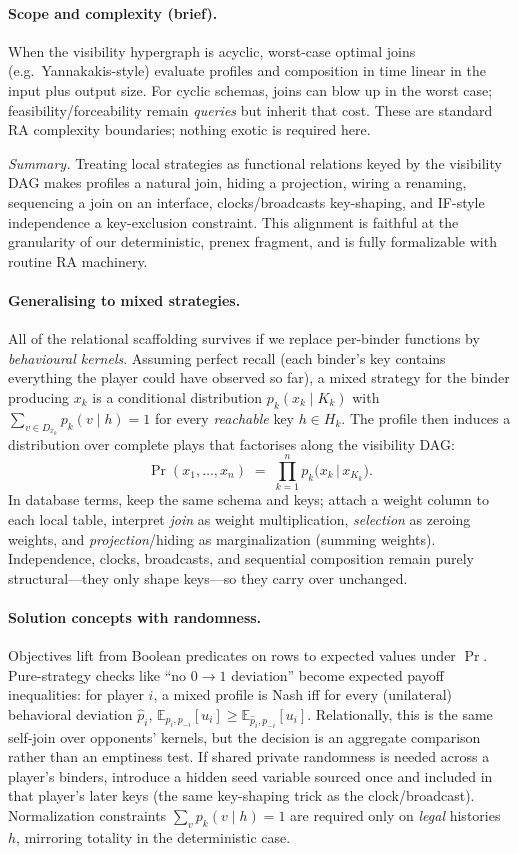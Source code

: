 \paragraph{Scope and complexity (brief).}
When the visibility hypergraph is acyclic, worst-case optimal joins (e.g.\
Yannakakis-style) evaluate profiles and composition in time linear in the
input plus output size.  For cyclic schemas, joins can blow up in the worst
case; feasibility/forceability remain \emph{queries} but inherit that cost.
These are standard RA complexity boundaries; nothing exotic is required here.

\medskip
\noindent
\emph{Summary.} Treating local strategies as functional relations keyed by the
visibility DAG makes profiles a natural join, hiding a projection, wiring a
renaming, sequencing a join on an interface, clocks/broadcasts key-shaping,
and IF-style independence a key-exclusion constraint.  This alignment is
faithful at the granularity of our deterministic, prenex fragment, and is
fully formalizable with routine RA machinery.

\paragraph{Generalising to mixed strategies.}
All of the relational scaffolding survives if we replace per-binder functions by
\emph{behavioural kernels}. Assuming perfect recall (each binder’s key contains
everything the player could have observed so far), a mixed strategy for the
binder producing $x_k$ is a conditional distribution
\(p_k(x_k \mid K_k)\) with \(\sum_{v\in D_{x_k}} p_k(v\mid h)=1\) for every
\emph{reachable} key $h\in H_k$. The profile then induces a distribution over
complete plays that factorises along the visibility DAG:
\[
  \Pr(x_1,\dots,x_n) \;=\; \prod_{k=1}^n p_k\!\big(x_k \,\big|\, x_{K_k}\big).
\]
In database terms, keep the same schema and keys; attach a weight column to each
local table, interpret \emph{join} as weight multiplication, \emph{selection} as
zeroing weights, and \emph{projection}/hiding as marginalization (summing
weights). Independence, clocks, broadcasts, and sequential composition remain
purely structural—they only shape keys—so they carry over unchanged.

\paragraph{Solution concepts with randomness.}
Objectives lift from Boolean predicates on rows to expected values under
\(\Pr\). Pure-strategy checks like “no $0\!\to\!1$ deviation” become expected
payoff inequalities: for player $i$, a mixed profile is Nash iff for every
(unilateral) behavioral deviation $\hat p_i$,
\(\mathbb{E}_{p_i,p_{-i}}[u_i] \ge \mathbb{E}_{\hat p_i,p_{-i}}[u_i]\).
Relationally, this is the same self-join over opponents’ kernels, but the
decision is an aggregate comparison rather than an emptiness test. If shared
private randomness is needed across a player’s binders, introduce a hidden seed
variable sourced once and included in that player’s later keys (the same
key-shaping trick as the clock/broadcast). Normalization constraints
\(\sum_{v} p_k(v\mid h)=1\) are required only on \emph{legal} histories $h$,
mirroring totality in the deterministic case.
